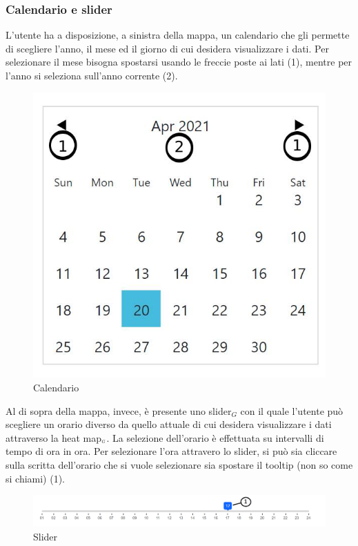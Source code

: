 \subsubsection{Calendario e slider}\label{UtilizzoDiGDPGatheringDetecionPlatformContenutoCentralePaginaInizialeHomeCalendarioESlider}
L'utente ha a disposizione, a sinistra della mappa, un calendario che gli permette di scegliere l'anno, il mese ed il giorno di cui desidera visualizzare i dati. Per selezionare il mese bisogna spostarsi usando le freccie poste ai lati (1), mentre per l'anno si seleziona sull'anno corrente (2).
\begin{center}
	\begin{figure}
		\includegraphics[width=0.3\linewidth]{../immagini/manualeUtente/Calendario.jpg}
		\caption{Calendario}
	\end{figure}
\end{center}
Al di sopra della mappa, invece, è presente uno slider$_G$ con il quale l'utente può scegliere un orario diverso da quello attuale di cui desidera visualizzare i dati attraverso la heat map$_{\scaleto{G}{3pt}}$. La selezione dell'orario è effettuata su intervalli di tempo di ora in ora. Per selezionare l'ora attravero lo slider, si può sia cliccare sulla scritta dell'orario che si vuole selezionare sia spostare il tooltip (non so come si chiami) (1).
\begin{center}
	\begin{figure}
		\includegraphics[width=1\linewidth]{../immagini/manualeUtente/Slider.png}
		\caption{Slider}
	\end{figure}
\end{center}

